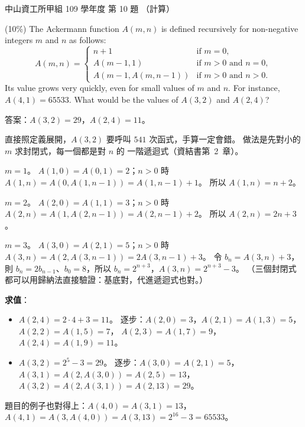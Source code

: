 \begin{pastexam}[label={px:nsysu-109-osds-04}]{中山資工所甲組 109 學年度 第 10 題}
（計算）

(10\%) The Ackermann function $A(m, n)$ is defined recursively for non-negative integers $m$ and $n$
as follows:
\[
A(m, n) = \begin{cases}
n + 1 & \text{if } m = 0,\\
A(m-1, 1) & \text{if } m > 0 \text{ and } n = 0,\\
A(m-1, A(m, n-1)) & \text{if } m > 0 \text{ and } n > 0.
\end{cases}
\]
Its value grows very quickly, even for small values of $m$ and $n$. For instance, $A(4, 1) = 65533$.
What would be the values of $A(3, 2)$ and $A(2, 4)$?
\end{pastexam}

\begin{pastsoln}
答案：$A(3, 2) = 29$，$A(2, 4) = 11$。

直接照定義展開，$A(3, 2)$ 要呼叫 $541$ 次函式，手算一定會錯。 做法是先對小的 $m$ 求封閉式，每一個都是對 $n$ 的
一階遞迴式（資結書第~2~章）。

\textbf{$m = 1$}。 $A(1, 0) = A(0, 1) = 2$；$n > 0$ 時 $A(1, n) = A(0, A(1, n-1)) = A(1, n-1) + 1$。 所以
$A(1, n) = n + 2$。

\textbf{$m = 2$}。 $A(2, 0) = A(1, 1) = 3$；$n > 0$ 時 $A(2, n) = A(1, A(2, n-1)) = A(2, n-1) + 2$。 所以
$A(2, n) = 2n + 3$。

\textbf{$m = 3$}。 $A(3, 0) = A(2, 1) = 5$；$n > 0$ 時 $A(3, n) = A(2, A(3, n-1)) = 2A(3, n-1) + 3$。 令
$b_n = A(3, n) + 3$，則 $b_n = 2b_{n-1}$、$b_0 = 8$，所以 $b_n = 2^{n+3}$，$A(3, n) = 2^{n+3} - 3$。
（三個封閉式都可以用歸納法直接驗證：基底對，代進遞迴式也對。）

\textbf{求值}：
\begin{itemize}
\item $A(2, 4) = 2 \cdot 4 + 3 = 11$。 逐步：$A(2, 0) = 3$，$A(2, 1) = A(1, 3) = 5$，$A(2, 2) = A(1, 5) = 7$，
$A(2, 3) = A(1, 7) = 9$，$A(2, 4) = A(1, 9) = 11$。
\item $A(3, 2) = 2^5 - 3 = 29$。 逐步：$A(3, 0) = A(2, 1) = 5$，$A(3, 1) = A(2, A(3, 0)) = A(2, 5) = 13$，
$A(3, 2) = A(2, A(3, 1)) = A(2, 13) = 29$。
\end{itemize}

題目的例子也對得上：$A(4, 0) = A(3, 1) = 13$，$A(4, 1) = A(3, A(4, 0)) = A(3, 13) = 2^{16} - 3 = 65533$。
\end{pastsoln}
